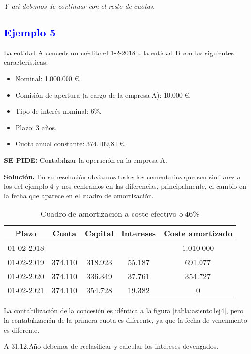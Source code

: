 \textit{Y así debemos de continuar con el resto de cuotas.}

\subsection*{\textcolor{blue}{Ejemplo 5}}

La entidad A concede un crédito el 1-2-2018 a la entidad B con las siguientes características:
\begin{itemize}
    \item Nominal: 1.000.000 €.
    \item Comisión de apertura (a cargo de la empresa A): 10.000 €.
    \item Tipo de interés nominal: 6\%.
    \item Plazo: 3 años.
    \item Cuota anual constante: 374.109,81 €.
\end{itemize}

\textbf{SE PIDE:} Contabilizar la operación en la empresa A.

\textbf{Solución.} En su resolución obviamos todos los comentarios que son similares a los del ejemplo 4 y nos centramos en las diferencias, principalmente, el cambio en la fecha que aparece en el cuadro de amortización.

\begin{table}[h!]
\centering
\begin{tabular}{|c|c|c|c|c|}
\hline
\textbf{Plazo} & \textbf{Cuota} & \textbf{Capital} & \textbf{Intereses} & \textbf{Coste amortizado} \\ \hline
01-02-2018 &  &  &  & 1.010.000 \\ \hline
01-02-2019 & 374.110 & 318.923 & 55.187 & 691.077 \\ \hline
01-02-2020 & 374.110 & 336.349 & 37.761 & 354.727 \\ \hline
01-02-2021 & 374.110 & 354.728 & 19.382 & 0 \\ \hline
\end{tabular}
\caption{Cuadro de amortización a coste efectivo 5,46\%}
\label{tabla:amortizacion2}
\end{table}

La contabilización de la concesión es idéntica a la figura \ref{tabla:asiento1ej4}, pero la contabilización de la primera cuota es diferente, ya que la fecha de vencimiento es diferente.

A 31.12.Año debemos de reclasificar y calcular los intereses devengados.

